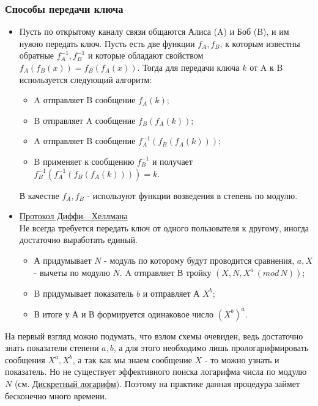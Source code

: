 \subsubsection{Способы передачи ключа}

\begin {itemize}
\item Пусть по открытому каналу связи общаются Алиса (A) и Боб (B), и им нужно передать ключ. Пусть есть две функции $f_{A}, f_{B}$, к которым известны обратные $f^{-1}_{A}, f^{-1}_{B}$ и которые обладают свойством $f_{A} (f_{B} (x)) = f_{B} (f_{A} (x))$. Тогда для передачи ключа $k$ от A к B используется следующий алгоритм:
\begin {itemize}
\item A отправляет B сообщение $f_{A} (k)$;
\item B отправляет A сообщение $f_{B}(f_{A} (k))$;
\item A отправляет B сообщение $f^{-1}_{A}(f_{B}(f_{A} (k)))$;
\item B применяет к сообщению $f^{-1}_{B}$ и получает $f^{-1}_{B}(f^{-1}_{A}(f_{B}(f_{A} (k)))) = k$.
\end {itemize}
В качестве $f_{A}, f_{B}$ - используют функции возведения в степень по модулю. \\

\item \href{https://clck.ru/9rNPo} {Протокол Диффи—Хеллмана}\\
Не всегда требуется передать ключ от одного пользователя к другому, иногда достаточно выработать единый. 
\begin {itemize}
\item А придумывает $N$ - модуль по которому будут проводится сравнения, $a, X$ - вычеты по модулю $N$. A отправляет В тройку $(X, N, X^{a} \, (mod \, N))$;
\item B придумывает показатель $b$ и отправляет А $X^{b}$;
\item В итоге у А и В формируется одинаковое число $\left( X^{b} \right)^{a}$.
\end {itemize}
\end{itemize}
На первый взгляд можно подумать, что взлом схемы очевиден, ведь достаточно знать показатели степени $a, b$, а для этого необходимо лишь прологарифмировать сообщения $X^a, X^b$, а так как мы знаем сообщение $X$ - то можно узнать и показатель. Но не существует эффективного поиска логарифма числа по модулю $N$ (см. \href{https://clck.ru/pv4S6}{Дискретный логарифм}). Поэтому на практике данная процедура займет бесконечно много времени.

